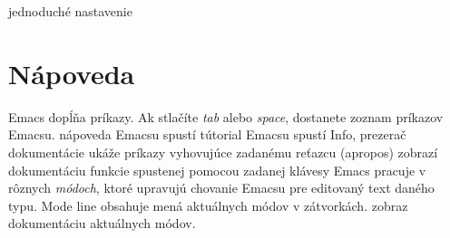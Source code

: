  jednoduché nastavenie

\section{Nápoveda}

Emacs dopĺňa príkazy. Ak stlačíte  {\it tab\/} alebo {\it
space\/}, dostanete zoznam príkazov Emacsu.
\askip
{} nápoveda Emacsu
 spustí tútorial Emacsu
 spustí Info, prezerač dokumentácie
 ukáže príkazy vyhovujúce zadanému reťazcu (apropos)
 zobrazí dokumentáciu funkcie spustenej pomocou zadanej klávesy
\askip
Emacs pracuje v rôznych {\it módoch}, ktoré upravujú chovanie
Emacsu pre editovaný text daného typu. Mode line obsahuje mená aktuálnych
módov v zátvorkách.
\askip
{} zobraz dokumentáciu aktuálnych módov.

\copyrightnotice

\bye

